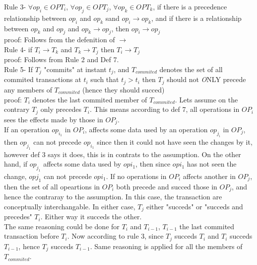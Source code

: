 \documentclass[a4paper, 11pt]{article}
\begin{document}
Rule 3- $\forall op_i \in  OP{T_i}$, $\forall op_j \in  OP{T_j}$, $\forall op_k \in  OP{T_k}$, if there is a precedence relationship between $op_i$ and $op_k$ sand $op_i \rightarrow op_k$, and if there is a relationship between $op_k$ and $op_j$ and $op_k \rightarrow op_j$, then $op_i \rightarrow op_j$ \\

proof: Follows from the defenition of $\rightarrow$ \\


Rule 4- if $T_i \rightarrow T_k$ and $T_k \rightarrow T_j$ then $T_i \rightarrow T_j$ \\

proof: Follows from Rule 2 and Def 7. \\ 


Rule 5- If $T_j$ "commits" at instant $t_j$, and $T_{commited}$ denotes the set of all commited transactions at $t_i$ such that $t_j > t_i$ then $T_j$ should not \emph ONLY precede any members of $T_{commited}$ (hence they should succed)\\

proof: $T_i$ denotes the last commited member of $T_{commited}$. Lets assume on the contrary $T_j$ only precedes $T_i$. This means according to def 7, all operations in $OP_i$ sees the effects made by those in $OP_j$. \\ 

If an operation $op_{i_1}$ in $OP_i$, affects some data used by an operation $op_{j_i}$ in $OP_j$, then $op_{j_1}$ can not precede $op_{i_1}$ since then it could not have seen the changes by it, however def 3 says it does, this is in contrats to the assumption. On the other hand, if $op_{j_1}$ affects some data used by $op{i_1}$, then since $op{i_1}$ has not seen the change, $op{j_1}$ can not precede $op{i_1}$. If no operations in $OP_i$ affects another in $OP_j$, then the set of all opeartions in $OP_i$ both precede and succed those in $OP_j$, and hence the contraray to the assumption. In this case, the transaction are conceptually interchangable. In either case, $T_j$ either "succeds" or "succeds and precedes" $T_i$. Either way it succeds the other. \\


The same reasoning could be done for $T_i$ and $T_{i-1}$, $T_{i-1}$ the last commited transaction before $T_{i}$. Now according to rule 3, since $T_j$ succeds $T_i$ and $T_i$ succeds $T_{i-1}$, hence $T_j$ succeds $T_{i-1}$. Same reasoning is applied for all the members of $T_{commited}$. \\ 
\end{document}

